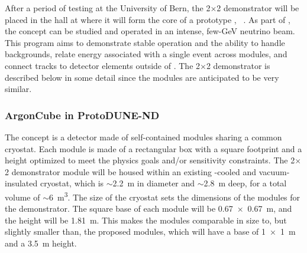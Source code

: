 After a period of testing at the University of Bern, the  2$\times$2 demonstrator will be placed in the    hall at  where it will form the core of a prototype   , ~\cite{bib:docdb12571}.   As part of  , the  concept can be studied and operated in an intense, few-GeV neutrino beam.  This program aims to demonstrate stable operation and the ability to handle backgrounds, relate energy associated with a single event across  modules, and connect tracks to detector elements outside of .  The  2$\times$2 demonstrator is described below in some detail since the    modules are anticipated to be very similar.


\subsubsection{ArgonCube in ProtoDUNE-ND}
\label{sec:appx-nd:2x2-design}


The   concept is a detector made of self-contained  modules sharing a common cryostat. Each module is made of a rectangular box with a square footprint and a height optimized to meet the physics goals and/or sensitivity constraints. The  2$\times$2 demonstrator module will be housed within an existing \lntwo-cooled and vacuum-insulated cryostat, 
which is $\sim$\SI{2.2}{\metre} in diameter and $\sim$\SI{2.8}{\metre} deep, for a total volume of $\sim$\SI{6}{\metre\cubed}. The size of the cryostat sets the dimensions of the modules for the demonstrator. The square base of each module will be \SI{0.67 x 0.67}{\metre}, and the height will be \SI{1.81}{\metre}. This makes the modules comparable in size to, but slightly smaller than, the proposed     modules, which will have a base of \SI{1 x 1}{\metre} and a \SI{3.5}{\metre} height.

